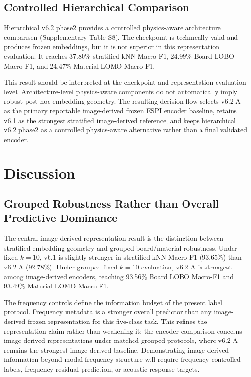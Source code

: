 \documentclass[review,3p,times]{elsarticle}
\begin{document}
\subsection{Controlled Hierarchical Comparison}
Hierarchical v6.2 phase2 provides a controlled physics-aware architecture comparison (Supplementary Table S8). The checkpoint is technically valid and produces frozen embeddings, but it is not superior in this representation evaluation. It reaches 37.80\% stratified kNN Macro-F1, 24.99\% Board LOBO Macro-F1, and 24.47\% Material LOMO Macro-F1.

This result should be interpreted at the checkpoint and representation-evaluation level. Architecture-level physics-aware components do not automatically imply robust post-hoc embedding geometry. The resulting decision flow selects v6.2-A as the primary reportable image-derived frozen ESPI encoder baseline, retains v6.1 as the strongest stratified image-derived reference, and keeps hierarchical v6.2 phase2 as a controlled physics-aware alternative rather than a final validated encoder.

\section{Discussion}
\label{sec:discussion}

\subsection{Grouped Robustness Rather than Overall Predictive Dominance}
The central image-derived representation result is the distinction between stratified embedding geometry and grouped board/material robustness. Under fixed $k=10$, v6.1 is slightly stronger in stratified kNN Macro-F1 (93.65\%) than v6.2-A (92.78\%). Under grouped fixed $k=10$ evaluation, v6.2-A is strongest among image-derived encoders, reaching 93.56\% Board LOBO Macro-F1 and 93.49\% Material LOMO Macro-F1.

The frequency controls define the information budget of the present label protocol. Frequency metadata is a stronger overall predictor than any image-derived frozen representation for this five-class task. This refines the representation claim rather than weakening it: the encoder comparison concerns image-derived representations under matched grouped protocols, where v6.2-A remains the strongest image-derived baseline. Demonstrating image-derived information beyond modal frequency structure will require frequency-controlled labels, frequency-residual prediction, or acoustic-response targets.
\end{document}
